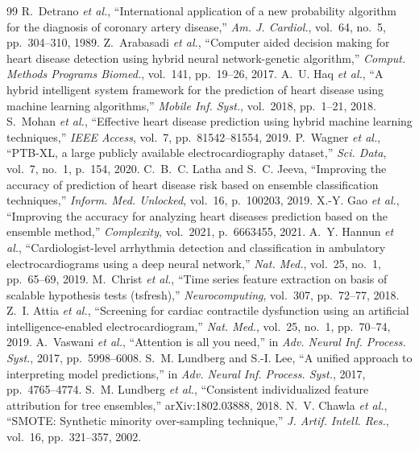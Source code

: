 \begin{thebibliography}{99}
\footnotesize
{} R.~Detrano \emph{et al.}, ``International application of a new probability algorithm for the diagnosis of coronary artery disease,'' \emph{Am. J. Cardiol.}, vol.~64, no.~5, pp.~304--310, 1989.
 Z.~Arabasadi \emph{et al.}, ``Computer aided decision making for heart disease detection using hybrid neural network-genetic algorithm,'' \emph{Comput. Methods Programs Biomed.}, vol.~141, pp.~19--26, 2017.
 A.~U. Haq \emph{et al.}, ``A hybrid intelligent system framework for the prediction of heart disease using machine learning algorithms,'' \emph{Mobile Inf. Syst.}, vol.~2018, pp.~1--21, 2018.
 S.~Mohan \emph{et al.}, ``Effective heart disease prediction using hybrid machine learning techniques,'' \emph{IEEE Access}, vol.~7, pp.~81542--81554, 2019.
 P.~Wagner \emph{et al.}, ``PTB-XL, a large publicly available electrocardiography dataset,'' \emph{Sci. Data}, vol.~7, no.~1, p.~154, 2020.
 C.~B.~C. Latha and S.~C. Jeeva, ``Improving the accuracy of prediction of heart disease risk based on ensemble classification techniques,'' \emph{Inform. Med. Unlocked}, vol.~16, p.~100203, 2019.
 X.-Y. Gao \emph{et al.}, ``Improving the accuracy for analyzing heart diseases prediction based on the ensemble method,'' \emph{Complexity}, vol.~2021, p.~6663455, 2021.
 A.~Y. Hannun \emph{et al.}, ``Cardiologist-level arrhythmia detection and classification in ambulatory electrocardiograms using a deep neural network,'' \emph{Nat. Med.}, vol.~25, no.~1, pp.~65--69, 2019.
 M.~Christ \emph{et al.}, ``Time series feature extraction on basis of scalable hypothesis tests (tsfresh),'' \emph{Neurocomputing}, vol.~307, pp.~72--77, 2018.
 Z.~I. Attia \emph{et al.}, ``Screening for cardiac contractile dysfunction using an artificial intelligence-enabled electrocardiogram,'' \emph{Nat. Med.}, vol.~25, no.~1, pp.~70--74, 2019.
 A.~Vaswani \emph{et al.}, ``Attention is all you need,'' in \emph{Adv. Neural Inf. Process. Syst.}, 2017, pp.~5998--6008.
 S.~M. Lundberg and S.-I. Lee, ``A unified approach to interpreting model predictions,'' in \emph{Adv. Neural Inf. Process. Syst.}, 2017, pp.~4765--4774.
 S.~M. Lundberg \emph{et al.}, ``Consistent individualized feature attribution for tree ensembles,'' arXiv:1802.03888, 2018.
 N.~V. Chawla \emph{et al.}, ``SMOTE: Synthetic minority over-sampling technique,'' \emph{J. Artif. Intell. Res.}, vol.~16, pp.~321--357, 2002.

\end{thebibliography}
